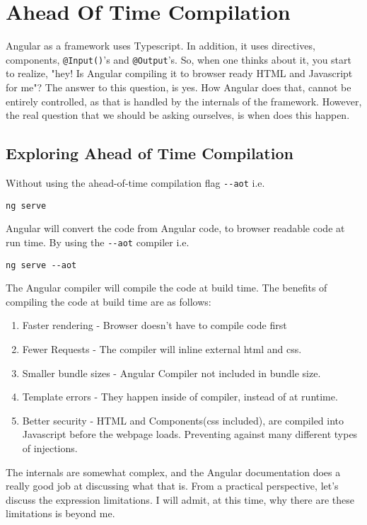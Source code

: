 \chapter{ Ahead Of Time Compilation }
Angular as a framework uses Typescript. In addition, it uses directives, components, 
\lstinline{@Input()}'s and \lstinline{@Output}'s. So, when one thinks about it, you 
start to realize, "hey! Is Angular compiling it to browser ready HTML and Javascript 
for me"? The answer to this question, is yes. How Angular does that, cannot be entirely 
controlled, as that is handled by the internals of the framework. However, the 
real question that we should be asking ourselves, is when does this happen. 

\section{Exploring Ahead of Time Compilation}
Without using the ahead-of-time compilation flag \lstinline{--aot} i.e. 
\begin{verbatim}
ng serve
\end{verbatim}

Angular will convert the code from Angular code, to browser readable 
code at run time. By using the \lstinline{--aot} compiler i.e.
\begin{verbatim}
ng serve --aot
\end{verbatim}

The Angular compiler will compile the code at build time. The benefits 
of compiling the code at build time are as follows: 
\begin{enumerate}
\item Faster rendering - Browser doesn't have to compile code first
\item Fewer Requests - The compiler will inline external html and css.
\item Smaller bundle sizes - Angular Compiler not included in bundle size. 
\item Template errors - They happen inside of compiler, instead of at runtime.
\item Better security - HTML and Components(css included), are compiled into 
Javascript before the webpage loads. Preventing against many different types
of injections. 
\end{enumerate}

The internals are somewhat complex, and the Angular documentation does a really
good job at discussing what that is. From a practical perspective, let's discuss 
the expression limitations. I will admit, at this time, why there are these 
limitations is beyond me. 

